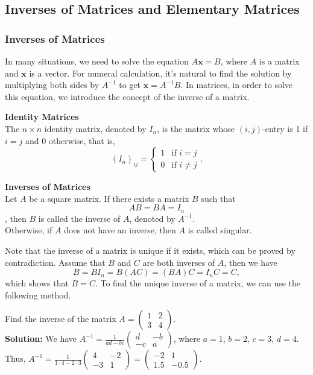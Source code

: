 \documentclass[10pt, a4paper]{article}
\begin{document}
\subsection{Inverses of Matrices and Elementary Matrices}
\subsubsection*{Inverses of Matrices}
In many situations, we need to solve the equation $A\mathbf{x} = B$, where $A$ is a matrix and $\mathbf{x}$ is a vector. For numeral calculation, it's natural to find the solution by multiplying both sides by $A^{-1}$ to get $\mathbf{x} = A^{-1}B$. In matrices, in order to solve this equation, we introduce the concept of the inverse of a matrix.
\begin{definition}
    \textbf{Identity Matrices}\\
    The $n\times n$ identity matrix, denoted by $I_n$, is the matrix whose $(i,j)$-entry is 1 if $i=j$ and 0 otherwise, that is, $$(I_n)_{ij} = \begin{cases} 1 & \text{if } i=j \\ 0 & \text{if } i\neq j \end{cases}.$$
\end{definition}
\begin{definition}
    \textbf{Inverses of Matrices}\\
    Let $A$ be a square matrix. If there exists a matrix $B$ such that $$AB = BA = I_n$$, then $B$ is called the inverse of $A$, denoted by $A^{-1}$.\\
    Otherwise, if $A$ does not have an inverse, then $A$ is called singular.
\end{definition}
Note that the inverse of a matrix is unique if it exists, which can be proved by contradiction. Assume that $B$ and $C$ are both inverses of $A$, then we have $$B = BI_n = B(AC) = (BA)C = I_nC = C,$$ which shows that $B=C$. To find the unique inverse of a matrix, we can use the following method.
\begin{example}
    Find the inverse of the matrix $A = \begin{pmatrix} 1 & 2 \\ 3 & 4 \end{pmatrix}$.\\
    \textbf{Solution:} We have $A^{-1} = \frac{1}{ad-bc}\begin{pmatrix} d & -b \\ -c & a \end{pmatrix}$, where $a=1$, $b=2$, $c=3$, $d=4$. Thus, $A^{-1} = \frac{1}{1\cdot 4 - 2\cdot 3}\begin{pmatrix} 4 & -2 \\ -3 & 1 \end{pmatrix} = \begin{pmatrix} -2 & 1 \\ 1.5 & -0.5 \end{pmatrix}$.
\end{example}
\end{document}
